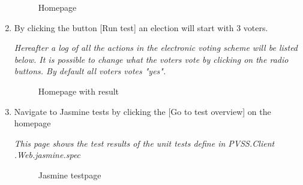 \begin{enumerate}
    \begin{figure}[H]
        \centering
        \caption{Homepage}
    \end{figure} 
    
    
    \item By clicking the button [Run test] an election will start with 3 voters. 
    
    \textit{Hereafter a log of all the actions in the electronic voting scheme will be listed below. It is possible to change what the voters vote by clicking on the radio buttons. By default all voters votes "yes". }  
    
    \begin{figure}[H]
        \centering
        \caption{Homepage with result}
    \end{figure} 
    
    \item Navigate to Jasmine tests by clicking the [Go to test overview] on the homepage
    
    \textit{This page shows the test results of the unit tests define in PVSS.Client\\.Web.jasmine.spec}

    \begin{figure}[H]
        \centering
        \caption{Jasmine testpage}
    \end{figure} 
    
\end{enumerate}





 
 




